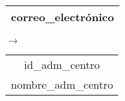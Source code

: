   \begin{center}
    \begin{minipage}{3.7cm}{\begin{flushright}\begin{tabular}{ | c | }
                  \hline
                  correo\_electrónico \\
                  \hline
                 \end{tabular}\end{flushright} }
    \end{minipage}
    \begin{minipage}{0.7cm}{$\longrightarrow$}
    \end{minipage}
    \begin{minipage}{5.9cm}{\begin{tabular}{ | c | }
                  \hline
                  id\_adm\_centro \\
                  nombre\_adm\_centro \\
                  \hline
                 \end{tabular} }
    \end{minipage}
  \end{center}